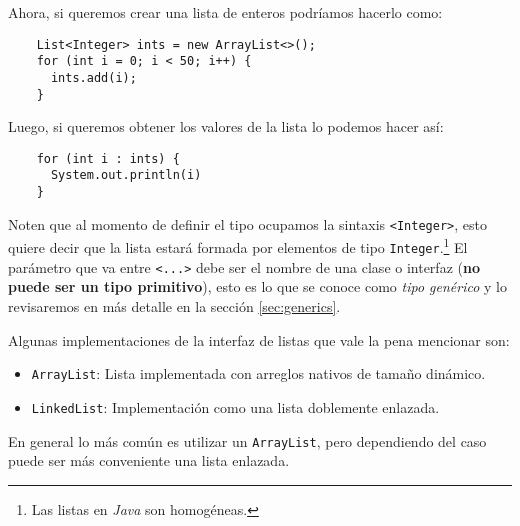   Ahora, si queremos crear una lista de enteros podríamos hacerlo como:
  \begin{verbatim}
    List<Integer> ints = new ArrayList<>();
    for (int i = 0; i < 50; i++) {
      ints.add(i);
    }
  \end{verbatim}

  Luego, si queremos obtener los valores de la lista lo podemos hacer así:
  \begin{verbatim}
    for (int i : ints) {
      System.out.println(i)
    }
  \end{verbatim}

  Noten que al momento de definir el tipo ocupamos la sintaxis \texttt{<Integer>}, esto quiere 
  decir que la lista estará formada por elementos de tipo \texttt{Integer}.\footnote{Las 
  listas en \textit{Java} son homogéneas.}
  El parámetro que va entre \texttt{<...>} debe ser el nombre de una clase o interfaz (\textbf{no 
  puede ser un tipo primitivo}), esto es lo que se conoce como \textit{tipo genérico} y lo 
  revisaremos en más detalle en la sección \ref{sec:generics}.

  Algunas implementaciones de la interfaz de listas que vale la pena mencionar son:
  \begin{itemize}
    \item \texttt{ArrayList}: Lista implementada con arreglos nativos de tamaño dinámico.
    \item \texttt{LinkedList}: Implementación como una lista doblemente enlazada.
  \end{itemize}

  En general lo más común es utilizar un \texttt{ArrayList}, pero dependiendo del caso puede ser
  más conveniente una lista enlazada.\autocite{so-linked-vs-array}